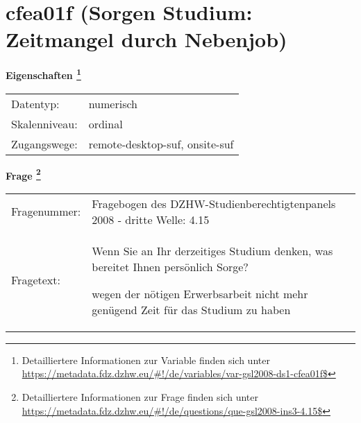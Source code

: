 
    \setcounter{footnote}{0}

    \vspace*{-1.8cm}
	\section{cfea01f (Sorgen Studium: Zeitmangel durch Nebenjob)}
	\label{section:cfea01f}



    \vspace*{0.5cm}
    \noindent\textbf{Eigenschaften
	\footnote{Detailliertere Informationen zur Variable finden sich unter
		\url{https://metadata.fdz.dzhw.eu/\#!/de/variables/var-gsl2008-ds1-cfea01f$}}}\\
	\begin{tabularx}{\hsize}{@{}lX}
	Datentyp: & numerisch \\
	Skalenniveau: & ordinal \\
	Zugangswege: &
	  remote-desktop-suf, 
	  onsite-suf
 \\
    \end{tabularx}



				\vspace*{0.5cm}
                \noindent\textbf{Frage
	                \footnote{Detailliertere Informationen zur Frage finden sich unter
		              \url{https://metadata.fdz.dzhw.eu/\#!/de/questions/que-gsl2008-ins3-4.15$}}}\\
				\begin{tabularx}{\hsize}{@{}lX}
					Fragenummer: &
					  Fragebogen des DZHW-Studienberechtigtenpanels 2008 - dritte Welle:
					  4.15
 \\
					Fragetext: & Wenn Sie an Ihr derzeitiges Studium denken, was bereitet Ihnen persönlich Sorge?\par  wegen der nötigen Erwerbsarbeit nicht mehr genügend Zeit für das Studium zu haben \\
				\end{tabularx}





